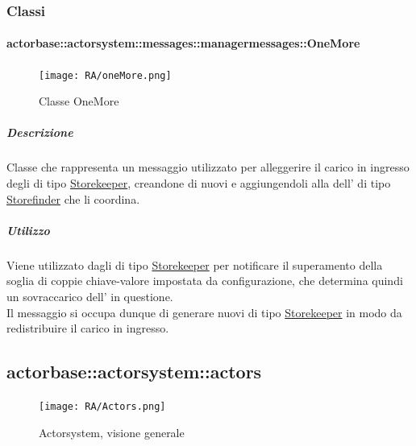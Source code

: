 \documentclass{scalatekids-article}
\begin{document}
\subsubsection{Classi}

\paragraph{actorbase::actorsystem::messages::managermessages::OneMore}

\begin{figure}[H]
  \begin{center}
    \texttt{[image: RA/oneMore.png]}
    \caption{Classe OneMore}
  \end{center}
\end{figure}

\subparagraph{Descrizione}
Classe che rappresenta un messaggio utilizzato per alleggerire il carico in
ingresso degli  di tipo
\hyperref[sec:actorbase::actorsystem::actors::storekeeper::Storekeeper]{Storekeeper},
creandone di nuovi e aggiungendoli alla  dell' di tipo
\hyperref[sec:actorbase::actorsystem::actors::storefinder::Storefinder]{Storefinder}
che li coordina.

\subparagraph{Utilizzo}
Viene utilizzato dagli  di tipo
\hyperref[sec:actorbase::actorsystem::actors::Storekeeper]{Storekeeper} per
notificare il superamento della soglia di coppie chiave-valore impostata da
configurazione, che determina quindi un sovraccarico dell' in
questione.\\ Il messaggio si occupa dunque di generare nuovi  di
tipo
\hyperref[sec:actorbase::actorsystem::actors::storekeeper::Storekeeper]{Storekeeper}
in modo da redistribuire il carico in ingresso.



\subsection{actorbase::actorsystem::actors} %
\label{sec:actorbase::actorsystem::actors}

\begin{figure}[H]
  \begin{center}
    \texttt{[image: RA/Actors.png]}
    \caption{Actorsystem, visione generale}
  \end{center}
\end{figure}
\end{document}
